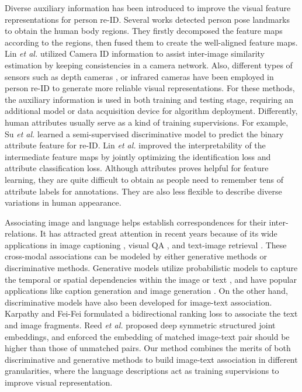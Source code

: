\documentclass[runningheads]{llncs}
\begin{document}
Diverse auxiliary information has been introduced to improve the visual feature representations for person re-ID. Several works \cite{zhao2017spindle, Su_2017_ICCV, ZhengHLY17} detected person pose landmarks to obtain the human body regions.  They firstly decomposed the feature maps according to the regions,  
then fused them to create the well-aligned feature maps.  Lin \emph{et al.} utilized Camera ID information to assist inter-image similarity estimation \cite{Lin2017CVPRcamera} by keeping consistencies in a camera network. Also, different types of sensors such as depth cameras \cite{barbosa2012re}, or infrared \cite{wu2017rgb} cameras have been employed in person re-ID to generate more reliable visual representations. For these methods, the auxiliary information is used in both training and testing stage, requiring an additional model or data acquisition device for algorithm deployment.  Differently, human attributes usually serve as a kind of training supervisions. For example, Su \emph{et al.} \cite{su2016deep} learned a semi-supervised discriminative model to predict the  binary attribute feature for re-ID. Lin \emph{et al.} \cite{attribute_liang} improved the interpretability of the intermediate feature maps by jointly optimizing the identification loss and attribute classification loss.  Although attributes proves helpful for feature learning, they are quite difficult to obtain as people need to remember tens of attribute labels for annotations. They are also less flexible to describe diverse variations in human appearance. 


Associating image and language helps establish correspondences for their inter-relations. It has attracted great attention  in recent years because of its wide applications in image captioning \cite{Karpathy_2017_PAMI, vinyals2015show, xu2015show, Mindeye,liu2018show}, visual QA \cite{antol2015vqa,li2018visual, Johnson_2016_CVPR}, and text-image retrieval \cite{frome2013devise, reed2016learning}. These cross-modal associations can be modeled by either generative methods or discriminative methods. Generative models utilize probabilistic models to capture the temporal or spatial dependencies within the image or text \cite{mirza2014conditional, vinyals2015show}, and have popular applications like caption generation \cite{vinyals2015show, xu2015show, Rennie_2017_CVPR, Anderson2017up-down, liu2018show} and image generation \cite{pmlr-v48-reed16, reed2016learning}. On the other hand, discriminative models have also been developed for image-text association. Karpathy and Fei-Fei \cite{Karpathy:2014} formulated a bidirectional ranking loss to associate the text and image fragments.  Reed \emph{et al.} \cite{reed2016learning} proposed deep symmetric structured joint embeddings, and enforced the embedding of matched image-text pair should be higher than those of unmatched pairs. Our method combines the merits of both discriminative and generative methods to build image-text association in different granularities, where the language descriptions act as training supervisions to improve visual representation.
\end{document}
